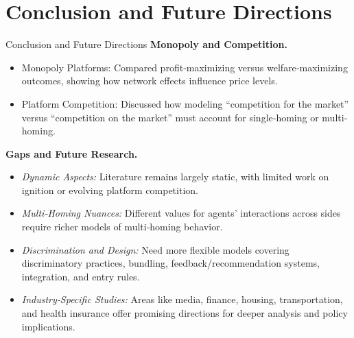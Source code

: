 \documentclass[aspectratio=169]{beamer}  %
\begin{document}
\section{Conclusion and Future Directions}
\begin{frame}{Conclusion and Future Directions}
    \justifying  %
    \textbf{Monopoly and Competition.}
    \begin{itemize}
      \item Monopoly Platforms: Compared profit‐maximizing versus welfare‐maximizing 
            outcomes, showing how network effects influence price levels.
      \item Platform Competition: Discussed how modeling “competition for the market” versus 
            “competition on the market” must account for single‐homing or multi‐homing. 
            
    \end{itemize}
\end{frame}

\begin{frame}
    \textbf{Gaps and Future Research.}
    \begin{itemize}
      \item \emph{Dynamic Aspects:} Literature remains largely static, with limited work on ignition 
            or evolving platform competition.
      \item \emph{Multi‐Homing Nuances:} Different values for agents’ interactions across sides 
            require richer models of multi‐homing behavior.
      \item \emph{Discrimination and Design:} Need more flexible models covering discriminatory 
            practices, bundling, feedback/recommendation systems, integration, and entry rules.
      \item \emph{Industry‐Specific Studies:} Areas like media, finance, housing, transportation, 
            and health insurance offer promising directions for deeper analysis and policy implications.
    \end{itemize}
\end{frame}
\end{document}
